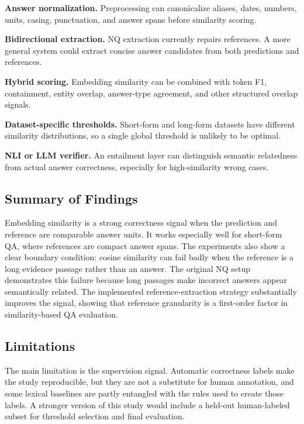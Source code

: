 \documentclass[11pt]{article}
\begin{document}
\textbf{Answer normalization.}
Preprocessing can canonicalize aliases, dates, numbers, units, casing, punctuation, and answer spans before similarity scoring.

\textbf{Bidirectional extraction.}
NQ extraction currently repairs references. A more general system could extract concise answer candidates from both predictions and references.

\textbf{Hybrid scoring.}
Embedding similarity can be combined with token F1, containment, entity overlap, answer-type agreement, and other structured overlap signals.

\textbf{Dataset-specific thresholds.}
Short-form and long-form datasets have different similarity distributions, so a single global threshold is unlikely to be optimal.

\textbf{NLI or LLM verifier.}
An entailment layer can distinguish semantic relatedness from actual answer correctness, especially for high-similarity wrong cases.

\subsection{Summary of Findings}

Embedding similarity is a strong correctness signal when the prediction and reference are comparable answer units. It works especially well for short-form QA, where references are compact answer spans. The experiments also show a clear boundary condition: cosine similarity can fail badly when the reference is a long evidence passage rather than an answer. The original NQ setup demonstrates this failure because long passages make incorrect answers appear semantically related. The implemented reference-extraction strategy substantially improves the signal, showing that reference granularity is a first-order factor in similarity-based QA evaluation.

\subsection{Limitations}

The main limitation is the supervision signal. Automatic correctness labels make the study reproducible, but they are not a substitute for human annotation, and some lexical baselines are partly entangled with the rules used to create those labels. A stronger version of this study would include a held-out human-labeled subset for threshold selection and final evaluation.
\end{document}
